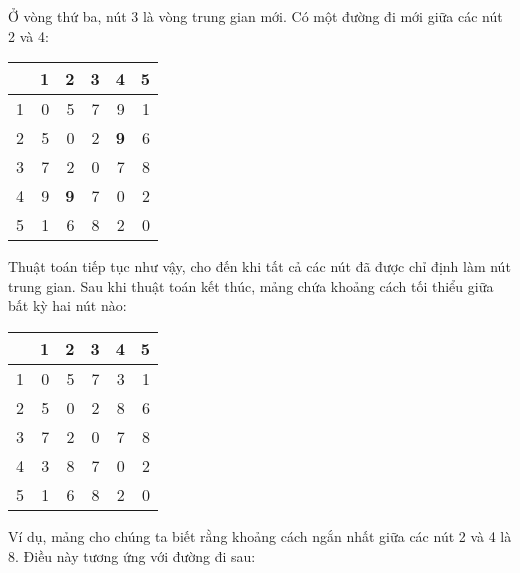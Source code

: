 Ở vòng thứ ba, nút 3 là vòng trung gian mới.
Có một đường đi mới giữa các nút 2 và 4:

\begin{center}
\begin{tabular}{r|rrrrr}
 & 1 & 2 & 3 & 4 & 5 \\
\hline
1 & 0 & 5 & 7 & 9 & 1 \\
2 & 5 & 0 & 2 & \textbf{9} & 6 \\
3 & 7 & 2 & 0 & 7 & 8 \\
4 & 9 & \textbf{9} & 7 & 0 & 2 \\
5 & 1 & 6 & 8 & 2 & 0 \\
\end{tabular}
\end{center}
\vspace{10pt}

Thuật toán tiếp tục như vậy,
cho đến khi tất cả các nút đã được chỉ định làm nút trung gian.
Sau khi thuật toán kết thúc, mảng chứa
khoảng cách tối thiểu giữa bất kỳ hai nút nào:

\begin{center}
\begin{tabular}{r|rrrrr}
 & 1 & 2 & 3 & 4 & 5 \\
\hline
1 & 0 & 5 & 7 & 3 & 1 \\
2 & 5 & 0 & 2 & 8 & 6 \\
3 & 7 & 2 & 0 & 7 & 8 \\
4 & 3 & 8 & 7 & 0 & 2 \\
5 & 1 & 6 & 8 & 2 & 0 \\
\end{tabular}
\end{center}

Ví dụ, mảng cho chúng ta biết rằng
khoảng cách ngắn nhất giữa các nút 2 và 4 là 8.
Điều này tương ứng với đường đi sau:

\begin{center}
\end{center}


